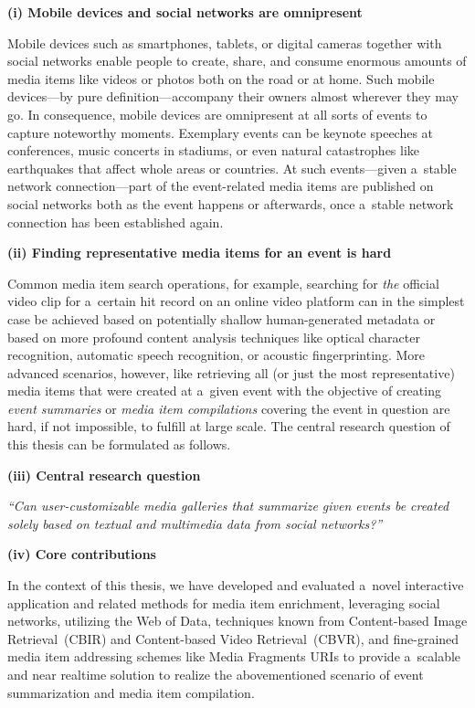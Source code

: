 \begin{abstracts}

\textbf{(i) Mobile devices and social networks are omnipresent}

Mobile devices such as smartphones, tablets, or digital cameras
together with social networks enable people to create,
share, and consume enormous amounts of media items
like videos or photos both on the road or at home.
Such mobile devices---by pure definition---accompany
their owners almost wherever they may go.
In consequence, mobile devices are omnipresent
at all sorts of events to capture noteworthy moments.
Exemplary events can be keynote speeches at conferences,
music concerts in stadiums,
or even natural catastrophes like earthquakes
that affect whole areas or countries.
At such events---given a~stable network connection---part of
the event-related media items are published on social networks
both as the event happens or afterwards,
once a~stable network connection has been established again.

\textbf{(ii) Finding representative media items
for an event is hard}

Common media item search operations,
for example, searching for \emph{the} official video clip
for a~certain hit record on an online video platform
can in the simplest case be achieved based on potentially
shallow human-generated metadata
or based on more profound content analysis techniques
like optical character recognition,
automatic speech recognition,
or acoustic fingerprinting.
More advanced scenarios, however, like retrieving all
(or just the most representative) media items
that were created at a~given event
with the objective of creating \emph{event summaries} or
\emph{media item compilations} covering the event in question
are hard, if not impossible, to fulfill at large scale.
The central research question of this thesis
can be formulated as follows.

\textbf{(iii) Central research question}

\textit{``Can user-customizable media galleries
that summarize given events be\linebreak
created solely based on textual and multimedia data
from social networks?''}

\textbf{(iv) Core contributions}

In the context of this thesis, we have developed and evaluated
a~novel interactive application and related methods
for media item enrichment,
leveraging social networks, utilizing the Web of Data,
techniques known from Content-based Image Retrieval~(CBIR)
and Content-based Video Retrieval~(CBVR),
and fine-grained media item addressing schemes
like Media Fragments URIs
to provide a~scalable and near realtime solution
to realize the abovementioned scenario
of event summarization and media item compilation.


\end{abstracts}
